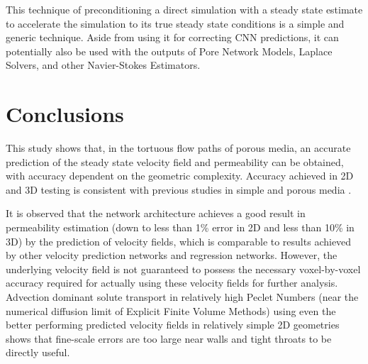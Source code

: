 \documentclass{article}
\begin{document}
This technique of preconditioning a direct simulation with a steady state estimate to accelerate the simulation to its true steady state conditions is a simple and generic technique. Aside from using it for correcting CNN predictions, it can potentially also be used with the outputs of Pore Network Models, Laplace Solvers, and other Navier-Stokes Estimators.



\pagebreak
\pagebreak

\section{Conclusions}
\label{sec:conclusions}

This study shows that, in the tortuous flow paths of porous media, an accurate prediction of the steady state velocity field and permeability can be obtained, with accuracy dependent on the geometric complexity. Accuracy achieved in 2D and 3D testing is consistent with previous studies in simple and porous media \cite{autodeskflow,poreflownet}. 

It is observed that the network architecture achieves a good result in permeability estimation (down to less than 1\% error in 2D and less than 10\% in 3D) by the prediction of velocity fields, which is comparable to results achieved by other velocity prediction networks and regression networks. However, the underlying velocity field is not guaranteed to possess the necessary voxel-by-voxel accuracy required for actually using these velocity fields for further analysis. Advection dominant solute transport in relatively high Peclet Numbers (near the numerical diffusion limit of Explicit Finite Volume Methods) using even the better performing predicted velocity fields in relatively simple 2D geometries shows that fine-scale errors are too large near walls and tight throats to be directly useful. 
\end{document}
